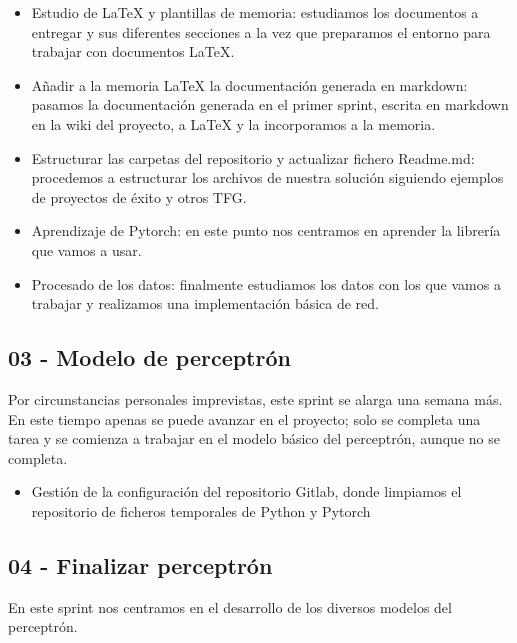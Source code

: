 \begin{itemize}
    \item Estudio de LaTeX y plantillas de memoria: estudiamos los documentos a entregar y sus diferentes secciones a la vez que preparamos el entorno para trabajar con documentos LaTeX.
    \item Añadir a la memoria LaTeX la documentación generada en markdown: pasamos la documentación generada en el primer sprint, escrita en markdown en la wiki del proyecto, a LaTeX y la incorporamos a la memoria.
    \item Estructurar las carpetas del repositorio y actualizar fichero Readme.md: procedemos a estructurar los archivos de nuestra solución siguiendo ejemplos de proyectos de éxito y otros TFG.
    \item Aprendizaje de Pytorch: en este punto nos centramos en aprender la librería que vamos a usar.
    \item Procesado de los datos: finalmente estudiamos los datos con los que vamos a trabajar y realizamos una implementación básica de red.
\end{itemize}


\subsection{03 - Modelo de perceptrón \newline
[16/03/2020 - 06/04/2020]}

Por circunstancias personales imprevistas, este sprint se alarga una semana más. En este tiempo apenas se puede avanzar en el proyecto; solo se completa una tarea y se comienza a trabajar en el modelo básico del perceptrón, aunque no se completa.

\begin{itemize}
    \item Gestión de la configuración del repositorio Gitlab, donde limpiamos el repositorio de ficheros temporales de Python y Pytorch
\end{itemize}


\subsection{04 - Finalizar perceptrón \newline
[07/04/2020 - 20/04/2020]}

En este sprint nos centramos en el desarrollo de los diversos modelos del perceptrón.

